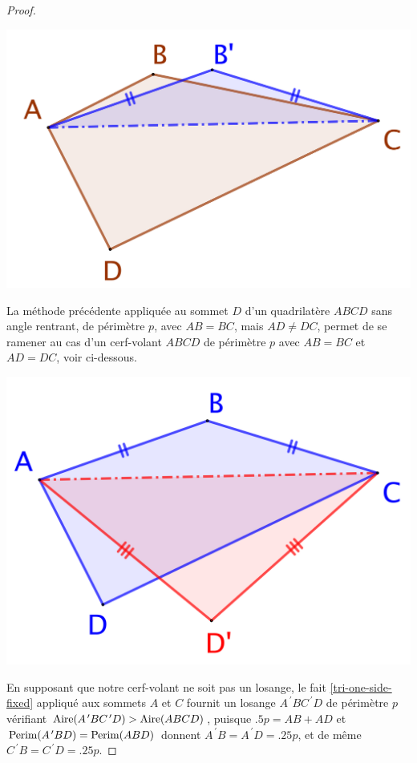 \begin{proof}
	\begin{center}
		\includegraphics[scale=.4]{content/quadrilateral/convex-gene.png}
	\end{center}
	
	
	La méthode précédente appliquée au sommet $D$ d'un quadrilatère $ABCD$ sans angle rentrant, de périmètre $p$, avec $AB = BC$, mais $AD \neq DC$, permet de se ramener au cas d'un cerf-volant $ABCD$ de périmètre $p$ avec $AB = BC$ et $AD = DC$, voir ci-dessous. 

	\begin{center}
		\includegraphics[scale=.4]{content/quadrilateral/convex-one-paire.png}
	\end{center}
	
	
	En supposant que notre cerf-volant ne soit pas un losange, le fait \ref{tri-one-side-fixed} appliqué aux sommets $A$ et $C$ fournit un losange $A^{\,\prime}BC^{\,\prime}D$ de périmètre $p$ vérifiant $\mathrm{Aire}(A^{\,\prime}BC^{\,\prime}D) > \mathrm{Aire}(ABCD)$, 
	puisque
	$\num{.5} p = AB + AD$
	et
	$\mathrm{Perim}(A^{\,\prime}BD) = \mathrm{Perim}(ABD)$
	donnent
	$A^{\,\prime}B = A^{\,\prime}D = \num{.25} p$,
	et de même
	$C^{\,\prime}B = C^{\,\prime}D = \num{.25} p$.


\end{proof}
